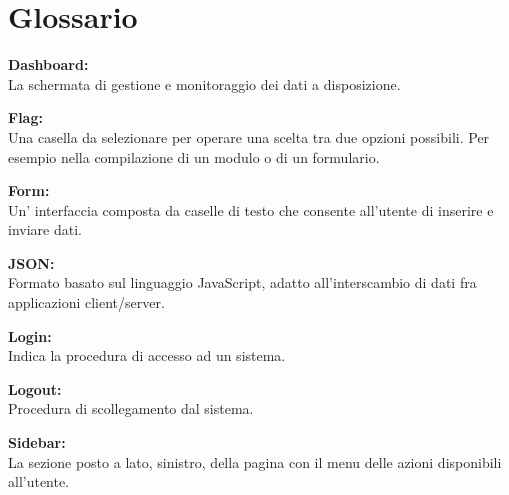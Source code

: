\section{Glossario}
\textbf{Dashboard:}\\La schermata di gestione e monitoraggio dei dati a disposizione.

\textbf{Flag:}\\Una casella da selezionare per operare una scelta tra due opzioni possibili. Per esempio nella compilazione di un modulo o di un formulario.

\textbf{Form:}\\Un' interfaccia composta da caselle di testo che consente all'utente di inserire e inviare dati.

\textbf{JSON:}\\ Formato basato sul linguaggio JavaScript, adatto all'interscambio di dati fra applicazioni client/server.

\textbf{Login:}\\ Indica la procedura di accesso ad un sistema.

\textbf{Logout:}\\ Procedura di scollegamento dal sistema.

\textbf{Sidebar:}\\ La sezione posto a lato, sinistro, della pagina con il menu delle azioni disponibili all'utente.